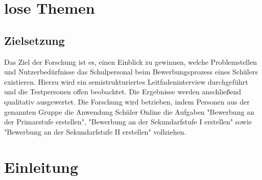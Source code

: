 \section{lose Themen}
\subsection{Zielsetzung}
Das Ziel der Forschung ist es, einen Einblick zu gewinnen, welche Problemstellen und Nutzerbedürfnisse das Schulpersonal beim Bewerbungsprozess eines Schülers existieren. Hierzu wird ein semistrukturiertes Leitfadeninterview durchgeführt und die Testpersonen offen beobachtet. Die Ergebnisse werden anschließend qualitativ ausgewertet. Die Forschung wird betrieben, indem Personen aus der genannten Gruppe die Anwendung Schüler Online die Aufgaben "Bewerbung an der Primarstufe erstellen", "Bewerbung an der Sekundarfstufe I erstellen" sowie "Bewerbung an der Sekundarfstufe II erstellen" vollziehen. 

\section{Einleitung}

